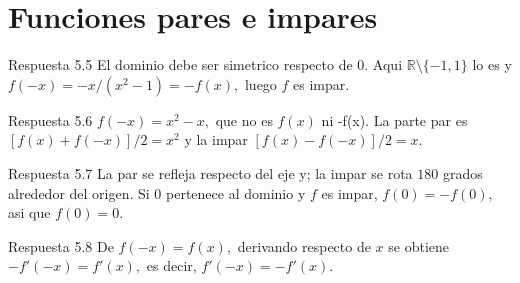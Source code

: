 \documentclass[10pt,a4paper,oneside,openany]{book}
\begin{document}
\section{Funciones pares e impares}
\begin{PSevenAnswerFixed}{Respuesta 5.5}
El dominio debe ser simetrico respecto de \(0\). Aqui \(\mathbb{R}\setminus \{-1,1\}\) lo es y \(f(-x)=-x/(x^{2}-1)=-f(x),\) luego \(f\) es impar.
\end{PSevenAnswerFixed}
\begin{PSevenAnswerFixed}{Respuesta 5.6}
\(f(-x)=x^{2}-x,\) que no es \(f(x)\) ni -f(x). La parte par es \([f(x)+f(-x)]/2=x^{2}\) y la impar \([f(x)-f(-x)]/2=x\).
\end{PSevenAnswerFixed}
\begin{PSevenAnswerFixed}{Respuesta 5.7}
La par se refleja respecto del eje y; la impar se rota \(180\) grados alrededor del origen. Si \(0\) pertenece al dominio y \(f\) es impar, \(f(0)=-f(0),\) asi que \(f(0)=0\).
\end{PSevenAnswerFixed}
\begin{PSevenAnswerFixed}{Respuesta 5.8}
De \(f(-x)=f(x),\) derivando respecto de \(x\) se obtiene \(-f'(-x)=f'(x),\) es decir, \(f'(-x)=-f'(x)\).
\end{PSevenAnswerFixed}
\end{document}
